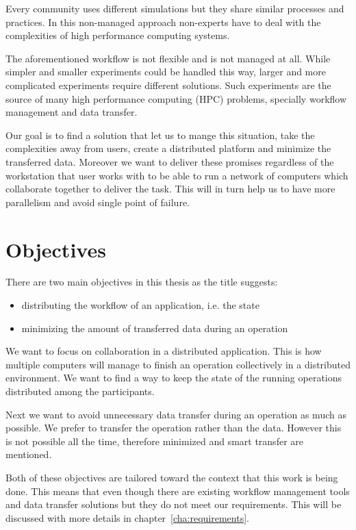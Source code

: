 Every community uses different simulations but they share similar processes and practices.
In this non-managed approach non-experts have to deal with the complexities of high performance computing systems.

The aforementioned workflow is not flexible and is not managed at all. 
While simpler and smaller experiments could be handled this way,
larger and more complicated experiments require different solutions. 
Such experiments are the source of many high performance computing (HPC) problems,
specially workflow management and data transfer.

Our goal is to find a solution that let us to mange this situation, 
take the complexities away from users, 
create a distributed platform and minimize the transferred data.
Moreover we want to deliver these promises regardless of the workstation that user works with to be
able to run a network of computers which collaborate together to deliver the task. 
This will in turn help us to have more parallelism and avoid single point of failure.

\section{Objectives}
There are two main objectives in this thesis as the title suggests:
\begin{itemize}
\item distributing the workflow of an application, i.e. the state
\item minimizing the amount of transferred data during an operation
\end{itemize}

We want to focus on collaboration in a distributed application.
This is how multiple computers will manage to finish an operation collectively in a distributed environment.
We want to find a way to keep the state of the running operations distributed among the participants.

Next we want to avoid unnecessary data transfer during an operation as much as possible.
We prefer to transfer the operation rather than the data.
However this is not possible all the time,
therefore minimized and smart transfer are mentioned.

Both of these objectives are tailored toward the context that this work is being done. 
This means that even though there are existing workflow management tools and data transfer solutions 
but they do not meet our requirements. 
This will be discussed with more details in chapter~\ref{cha:requirements}.


